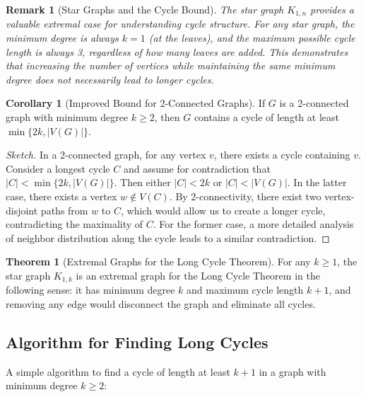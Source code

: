 \documentclass{article}
\newtheorem{remark}{Remark}
\theoremstyle{definition}
\newtheorem{theorem}{Theorem}
\newtheorem{corollary}{Corollary}
\begin{document}
\begin{remark}[Star Graphs and the Cycle Bound]
The star graph $K_{1,n}$ provides a valuable extremal case for understanding cycle structure. For any star graph, the minimum degree is always $k=1$ (at the leaves), and the maximum possible cycle length is always 3, regardless of how many leaves are added. This demonstrates that increasing the number of vertices while maintaining the same minimum degree does not necessarily lead to longer cycles.
\end{remark}

\begin{corollary}[Improved Bound for 2-Connected Graphs]
If $G$ is a 2-connected graph with minimum degree $k \geq 2$, then $G$ contains a cycle of length at least $\min\{2k, |V(G)|\}$.
\end{corollary}

\begin{proof}[Sketch]
In a 2-connected graph, for any vertex $v$, there exists a cycle containing $v$. Consider a longest cycle $C$ and assume for contradiction that $|C| < \min\{2k, |V(G)|\}$. Then either $|C| < 2k$ or $|C| < |V(G)|$. In the latter case, there exists a vertex $w \notin V(C)$. By 2-connectivity, there exist two vertex-disjoint paths from $w$ to $C$, which would allow us to create a longer cycle, contradicting the maximality of $C$. For the former case, a more detailed analysis of neighbor distribution along the cycle leads to a similar contradiction.
\end{proof}

\begin{theorem}[Extremal Graphs for the Long Cycle Theorem]
For any $k \geq 1$, the star graph $K_{1,k}$ is an extremal graph for the Long Cycle Theorem in the following sense: it has minimum degree $k$ and maximum cycle length $k+1$, and removing any edge would disconnect the graph and eliminate all cycles.
\end{theorem}

\subsection{Algorithm for Finding Long Cycles}
A simple algorithm to find a cycle of length at least $k+1$ in a graph with minimum degree $k \geq 2$:
\end{document}
